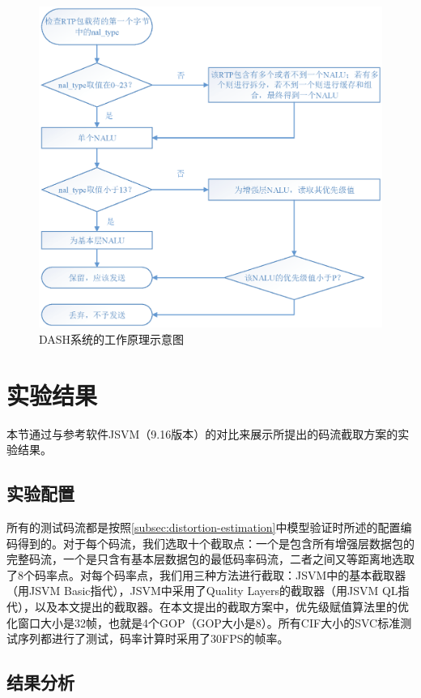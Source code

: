 \begin{figure}[!ht]
	\centering
	\includegraphics[width = 1.0\linewidth]{eps/extraction-flow}
	\caption{DASH系统的工作原理示意图\label{fig:extraction-flow}}
\end{figure}

\section{实验结果}

本节通过与参考软件JSVM（9.16版本）的对比来展示所提出的码流截取方案的实验结果。

\subsection{实验配置}

所有的测试码流都是按照\ref{subsec:distortion-estimation}中模型验证时所述的配置编码得到的。对于每个码流，我们选取十个截取点：一个是包含所有增强层数据包的完整码流，一个是只含有基本层数据包的最低码率码流，二者之间又等距离地选取了8个码率点。对每个码率点，我们用三种方法进行截取：JSVM中的基本截取器（用JSVM Basic指代），JSVM中采用了Quality Layers的截取器（用JSVM QL指代），以及本文提出的截取器。在本文提出的截取方案中，优先级赋值算法里的优化窗口大小是32帧，也就是4个GOP（GOP大小是8）。所有CIF大小的SVC标准测试序列都进行了测试，码率计算时采用了30FPS的帧率。

\subsection{结果分析}


